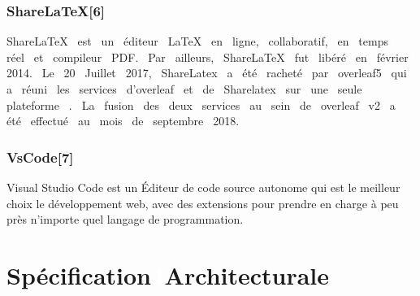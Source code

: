 \subsubsection*{ShareLaTeX[6]}
ShareLaTeX\textcolor{white}{J} est\textcolor{white}{J} un\textcolor{white}{J} éditeur\textcolor{white}{J} LaTeX\textcolor{white}{J} en\textcolor{white}{J} ligne,\textcolor{white}{J} collaboratif,\textcolor{white}{J} en\textcolor{white}{J} temps\textcolor{white}{J} réel\textcolor{white}{J} et\textcolor{white}{J} compileur\textcolor{white}{J} PDF.\textcolor{white}{J} Par\textcolor{white}{J} ailleurs,\textcolor{white}{J} ShareLaTeX\textcolor{white}{J} fut\textcolor{white}{J} libéré\textcolor{white}{J} en\textcolor{white}{J} février\textcolor{white}{J} 2014.\textcolor{white}{J} Le\textcolor{white}{J} 20\textcolor{white}{J} Juillet\textcolor{white}{J} 2017,\textcolor{white}{J} ShareLatex\textcolor{white}{J} a\textcolor{white}{J} été\textcolor{white}{J} racheté\textcolor{white}{J} par\textcolor{white}{J} overleaf5\textcolor{white}{J} qui\textcolor{white}{J} a\textcolor{white}{J} réuni\textcolor{white}{J} les\textcolor{white}{J} services\textcolor{white}{J} d'overleaf\textcolor{white}{J} et\textcolor{white}{J} de\textcolor{white}{J} Sharelatex\textcolor{white}{J} sur\textcolor{white}{J} une\textcolor{white}{J} seule\textcolor{white}{J} plateforme\textcolor{white}{J} .\textcolor{white}{J} La\textcolor{white}{J} fusion\textcolor{white}{J} des\textcolor{white}{J} deux\textcolor{white}{J} services\textcolor{white}{J} au\textcolor{white}{J} sein\textcolor{white}{J} de\textcolor{white}{J} overleaf\textcolor{white}{J} v2\textcolor{white}{J} a\textcolor{white}{J} été\textcolor{white}{J} effectué\textcolor{white}{J} au\textcolor{white}{J} mois\textcolor{white}{J} de\textcolor{white}{J} septembre\textcolor{white}{J} 2018. \\



\subsubsection*{VsCode[7]}
Visual Studio Code est un Éditeur de code source autonome qui est le meilleur choix le développement web, avec des extensions pour prendre en charge à peu près n’importe quel langage de programmation.




\section{Spécification\textcolor{white}{J}Architecturale}

